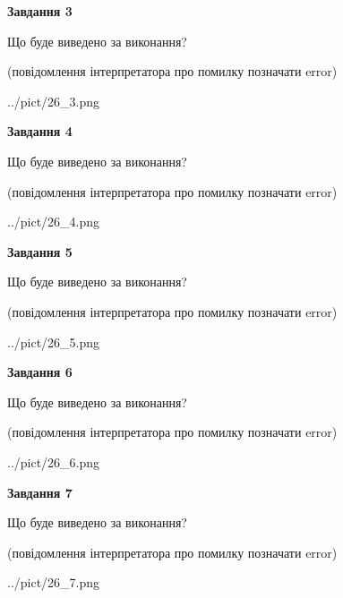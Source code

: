 \documentclass[12pt, ukrainian]{article}
\begin{document}
{\begin {large}
{\begin {center}\textbf{Завдання 3}\end {center}}\par
Що буде виведено за виконання?\par
 (повідомлення інтерпретатора про помилку позначати error)\par
\begin{center}
	{../pict/26_3.png}
\end{center}
\newpage

{\begin {center}\textbf{Завдання 4}\end {center}}\par
Що буде виведено за виконання?\par
 (повідомлення інтерпретатора про помилку позначати error)\par
\begin{center}
	{../pict/26_4.png}
\end{center}
\newpage

{\begin {center}\textbf{Завдання 5}\end {center}}\par
Що буде виведено за виконання?\par
 (повідомлення інтерпретатора про помилку позначати error)\par
\begin{center}
	{../pict/26_5.png}
\end{center}
\newpage

{\begin {center}\textbf{Завдання 6}\end {center}}\par
Що буде виведено за виконання?\par
 (повідомлення інтерпретатора про помилку позначати error)\par
\begin{center}
	{../pict/26_6.png}
\end{center}
\newpage

{\begin {center}\textbf{Завдання 7}\end {center}}\par
Що буде виведено за виконання?\par
 (повідомлення інтерпретатора про помилку позначати error)\par
\begin{center}
	{../pict/26_7.png}
\end{center}
\newpage


\end{large}}
\end{document}
